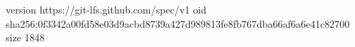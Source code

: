 version https://git-lfs.github.com/spec/v1
oid sha256:0f3342a00fd58e03d9acbd8739a427d989813fe8fb767dba66af6a6e41c82700
size 1848
